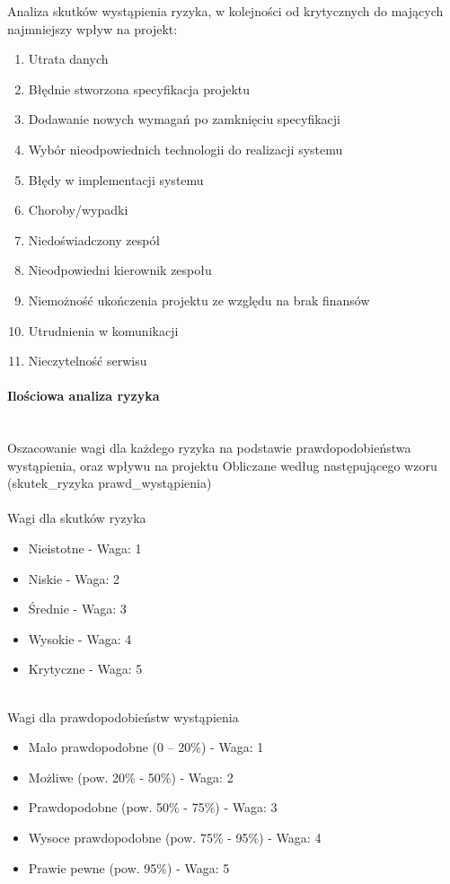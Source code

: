 \documentclass{article}
\begin{document}
Analiza skutków wystąpienia ryzyka, w kolejności od krytycznych do mających najmniejszy wpływ na projekt:
\begin{enumerate}
\item{Utrata danych}
\item{Błędnie stworzona specyfikacja projektu}
\item{Dodawanie nowych wymagań po zamknięciu specyfikacji}
\item{Wybór nieodpowiednich technologii do realizacji systemu}
\item{Błędy w implementacji systemu}
\item{Choroby/wypadki}
\item{Niedoświadczony zespół}
\item{Nieodpowiedni kierownik zespołu}
\item{Niemożność ukończenia projektu ze względu na brak finansów}
\item{Utrudnienia w komunikacji}
\item{Nieczytelność serwisu}
\end{enumerate}


\paragraph{Ilościowa analiza ryzyka} \mbox{}\\

Oszacowanie wagi dla każdego ryzyka na podstawie prawdopodobieństwa wystąpienia, oraz wpływu na projektu
Obliczane według następującego wzoru (skutek\_ryzyka \* prawd\_wystąpienia)
\mbox{}\\\mbox{}\\

Wagi dla skutków ryzyka
\begin{itemize}
\item{Nieistotne - Waga: 1}
\item{Niskie     - Waga: 2}
\item{Średnie    - Waga: 3}
\item{Wysokie	 - Waga: 4}
\item{Krytyczne	 - Waga: 5}
\end{itemize}
\mbox{}\\

Wagi dla prawdopodobieństw wystąpienia
\begin{itemize}
\item{Mało prawdopodobne (0 – 20\%) - Waga: 1}
\item{Możliwe (pow. 20\% - 50\%) - Waga: 2}
\item{Prawdopodobne (pow. 50\% - 75\%) - Waga: 3}
\item{Wysoce prawdopodobne (pow. 75\% - 95\%) - Waga: 4}
\item{Prawie pewne (pow. 95\%) - Waga: 5}
\end{itemize}
\mbox{}\\ \mbox{}\\
\end{document}
